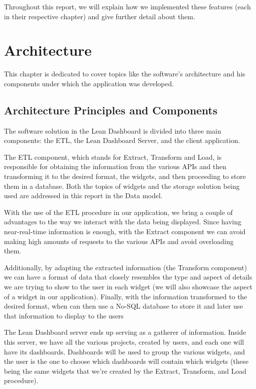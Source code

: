 \documentclass[a4paper,twoside,10pt]{report}
\begin{document}
Throughout this report, we will explain how we implemented these features (each in their respective chapter) and give further detail about them.

\chapter{Architecture}
This chapter is dedicated to cover topics like the software's architecture and his components under which the application was developed. 
\section{Architecture Principles and Components}
The software solution in the Lean Dashboard is divided into three main components: the ETL\cite{ETLPROC}, the Lean Dashboard Server, and the client application.
 
The ETL component, which stands for Extract, Transform and Load, is responsible for obtaining the information from the various APIs and then transforming it to the desired format, the widgets, and then proceeding to store them in a database. Both the topics of widgets and the storage solution being used are addressed in this report in the Data model.
 
With the use of the ETL procedure in our application, we bring a couple of advantages to the way we interact with the data being displayed. Since having near-real-time information is enough, with the Extract component we can avoid making high amounts of requests to the various APIs and avoid overloading them.
 
Additionally, by adapting the extracted information (the Transform component) we can have a format of data that closely resembles the type and aspect of details we are trying to show to the user in each widget (we will also showcase the aspect of a widget in our application). Finally, with the information transformed to the desired format, when can then use a No-SQL database to store it and later use that information to display to the users 
 
The Lean Dashboard server ends up serving as a gatherer of information. Inside this server, we have all the various projects, created by users, and each one will have its dashboards. Dashboards will be used to group the various widgets, and the user is the one to choose which dashboards will contain which widgets (these being the same widgets that we're created by the Extract, Transform, and Load procedure).
 
\end{document}
